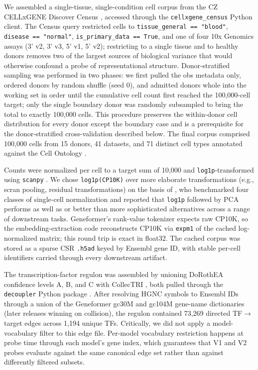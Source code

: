 \documentclass[
  11pt,
]{article}
\begin{document}
We assembled a single-tissue, single-condition cell corpus from the CZ
CELLxGENE Discover Census \citep{cellxgene2025}, accessed through the \texttt{cellxgene\_census}
Python client. The Census query restricted cells to
\texttt{tissue\_general\ ==\ "blood"}, \texttt{disease\ ==\ "normal"},
\texttt{is\_primary\_data\ ==\ True}, and one of four 10x Genomics
assays (3' v2, 3' v3, 5' v1, 5' v2); restricting to a single tissue and
to healthy donors removes two of the largest sources of biological
variance that would otherwise confound a probe of representational
structure. Donor-stratified sampling was performed in two phases: we
first pulled the obs metadata only, ordered donors by random shuffle
(seed 0), and admitted donors whole into the working set in order until
the cumulative cell count first reached the 100,000-cell target; only
the single boundary donor was randomly subsampled to bring the total to
exactly 100,000 cells. This procedure preserves the within-donor cell
distribution for every donor except the boundary case and is a
prerequisite for the donor-stratified cross-validation described below.
The final corpus comprised 100,000 cells from 15 donors, 41 datasets,
and 71 distinct cell types annotated against the Cell Ontology \citep{diehl2016cellontology}.

Counts were normalized per cell to a target sum of 10,000 and
\texttt{log1p}-transformed using \texttt{scanpy} \citep{wolf2018scanpy}. We
chose \texttt{log1p(CP10K)} over more elaborate transformations (e.g.,
scran pooling, residual transformations) on the basis of
\citet{ahlmanneltze2023normalization}, who benchmarked four classes of single-cell
normalization and reported that \texttt{log1p} followed by PCA performs
as well as or better than more sophisticated alternatives across a range
of downstream tasks. Geneformer's rank-value tokenizer expects raw
CP10K, so the embedding-extraction code reconstructs CP10K via
\texttt{expm1} of the cached log-normalized matrix; this round trip is
exact in float32. The cached corpus was stored as a sparse CSR
\texttt{.h5ad} keyed by Ensembl gene ID, with stable per-cell
identifiers carried through every downstream artifact.

The transcription-factor regulon was assembled by unioning DoRothEA
confidence levels A, B, and C \citep{garciaalonso2019dorothea} with CollecTRI \citep{mullerdott2023collectri}, both pulled through the
\texttt{decoupler} Python package \citep{badiaimompel2022decoupler}. After
resolving HGNC symbols to Ensembl IDs through a union of the Geneformer
gc30M and gc104M gene-name dictionaries (later releases winning on
collision), the regulon contained 73,269 directed TF$\to$target edges across
1,194 unique TFs. Critically, we did not apply a model-vocabulary filter
to this edge file. Per-model vocabulary restriction happens at probe
time through each model's gene index, which guarantees that V1 and V2
probes evaluate against the same canonical edge set rather than against
differently filtered subsets.
\end{document}
